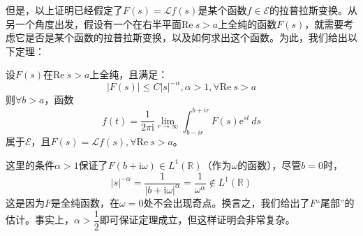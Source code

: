 \documentclass{ctexbook}
\begin{document}
但是，以上证明已经假定了$F(s)=\mathcal{L} f(s)$是某个函数$f\in\mathcal{E} $的拉普拉斯变换。从另一个角度出发，假设有一个在右半平面$\text{Re}\ s>a$上全纯的函数$F(s)$，就需要考虑它是否是某个函数的拉普拉斯变换，以及如何求出这个函数。为此，我们给出以下定理\cite{distribution}：
\begin{theorem}[*拉普拉斯反演公式]
    设$F(s)$在$\text{Re}\ s>a$上全纯，且满足：
    \[|F(s)|\leq C|s|^{-\alpha},\alpha>1,\forall \text{Re}\ s>a\]
    则$\forall b>a$，函数
    \[f(t)=\frac{1}{2\pi \mathrm{i}}\lim_{r\to\infty}\int_{b-ir}^{b +ir}F(s)\mathrm{e}^{st}\,ds\]
    属于$\mathcal{E} $，且$F(s)=\mathcal{L} f(s),\forall \text{Re}\ s>a$。
\end{theorem}
\begin{remark}
    这里的条件$\alpha>1$保证了$F(b+\mathrm{i}\omega)\in L^1(\mathbb{R})$（作为$\omega$的函数），尽管$b=0$时，
    $$|s|^{-\alpha}=\dfrac{1}{|b+\mathrm{i}\omega|^{\alpha}}=\frac{1}{\omega^{\alpha}}\notin L^1(\mathbb{R})$$
    这是因为$F$是全纯函数，在$\omega=0$处不会出现奇点。换言之，我们给出了$F$“尾部”的估计。事实上，$\alpha>\dfrac{1}{2}$即可保证定理成立，但这样证明会非常复杂\cite{folland}。
\end{remark}
\end{document}
